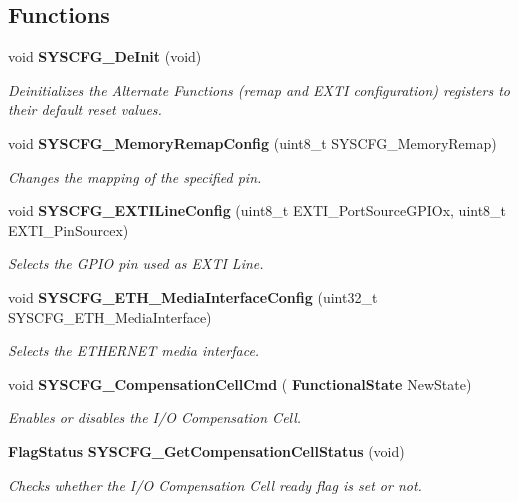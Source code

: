 \subsection*{Functions}
\begin{DoxyCompactItemize}
\item 
void \textbf{ S\+Y\+S\+C\+F\+G\+\_\+\+De\+Init} (void)
\begin{DoxyCompactList}\small\item\em Deinitializes the Alternate Functions (remap and E\+X\+TI configuration) registers to their default reset values. \end{DoxyCompactList}\item 
void \textbf{ S\+Y\+S\+C\+F\+G\+\_\+\+Memory\+Remap\+Config} (uint8\+\_\+t S\+Y\+S\+C\+F\+G\+\_\+\+Memory\+Remap)
\begin{DoxyCompactList}\small\item\em Changes the mapping of the specified pin. \end{DoxyCompactList}\item 
void \textbf{ S\+Y\+S\+C\+F\+G\+\_\+\+E\+X\+T\+I\+Line\+Config} (uint8\+\_\+t E\+X\+T\+I\+\_\+\+Port\+Source\+G\+P\+I\+Ox, uint8\+\_\+t E\+X\+T\+I\+\_\+\+Pin\+Sourcex)
\begin{DoxyCompactList}\small\item\em Selects the G\+P\+IO pin used as E\+X\+TI Line. \end{DoxyCompactList}\item 
void \textbf{ S\+Y\+S\+C\+F\+G\+\_\+\+E\+T\+H\+\_\+\+Media\+Interface\+Config} (uint32\+\_\+t S\+Y\+S\+C\+F\+G\+\_\+\+E\+T\+H\+\_\+\+Media\+Interface)
\begin{DoxyCompactList}\small\item\em Selects the E\+T\+H\+E\+R\+N\+ET media interface. \end{DoxyCompactList}\item 
void \textbf{ S\+Y\+S\+C\+F\+G\+\_\+\+Compensation\+Cell\+Cmd} (\textbf{ Functional\+State} New\+State)
\begin{DoxyCompactList}\small\item\em Enables or disables the I/O Compensation Cell. \end{DoxyCompactList}\item 
\textbf{ Flag\+Status} \textbf{ S\+Y\+S\+C\+F\+G\+\_\+\+Get\+Compensation\+Cell\+Status} (void)
\begin{DoxyCompactList}\small\item\em Checks whether the I/O Compensation Cell ready flag is set or not. \end{DoxyCompactList}\end{DoxyCompactItemize}


